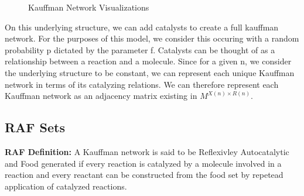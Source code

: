 \documentclass{article}
\begin{document}
\begin{figure}[h]%
    \centering
    \qquad
    \caption{Kauffman Network Visualizations}
\end{figure}

On this underlying structure, we can add catalysts to create a full kauffman network.
For the purposes of this model, we consider this occuring with a random probability p dictated by the parameter f.
Catalysts can be thought of as a relationship between a reaction and a molecule. 
Since for a given n, we consider the underlying structure to be constant, we can represent each unique Kauffman network in terms of its catalyzing relations.
We can therefore represent each Kauffman network as an adjacency matrix existing in $M^{X(n) \times R(n)}$.  \\

\subsection{RAF Sets}
\textbf{RAF Definition:} A Kauffman network is said to be Reflexivley Autocatalytic and Food generated if every reaction is catalyzed by a molecule involved in a reaction and every reactant can be constructed from the food set by repetead application of catalyzed reactions. \\
\end{document}
